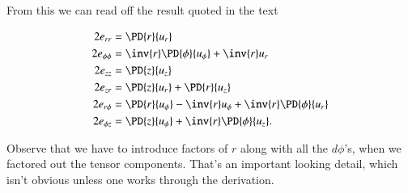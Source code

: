 From this we can read off the result quoted in the text

\begin{align}\label{eqn:continuumL2:n}
2 e_{rr} &= \PD{r}{u_r}  \\
2 e_{\phi\phi} &= \inv{r} \PD{\phi}{u_\phi} +\inv{r} u_r  \\
2 e_{zz} &= \PD{z}{u_z}  \\
2 e_{zr} &= \PD{z}{u_r} + \PD{r}{u_z} \\
2 e_{r\phi} &= \PD{r}{u_\phi} - \inv{r} u_\phi + \inv{r} \PD{\phi}{u_r} \\
2 e_{\phi z} &= \PD{z}{u_\phi} +\inv{r} \PD{\phi}{u_z}.
\end{align}

Observe that we have to introduce factors of $r$ along with all the $d\phi$'s, when we factored out the tensor components.  That's an important looking detail, which isn't obvious unless one works through the derivation.

\EndArticle
